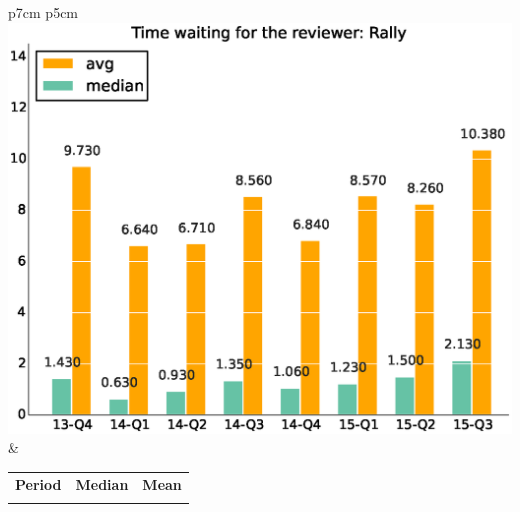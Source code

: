 \documentclass[a4wide,11pt]{article}
\begin{document}
\begin{tabular}{p{7cm} p{5cm}}
    \vspace{0pt} 
    \includegraphics[scale=.35]{figs/waiting4reviewer_avgRally.eps}
    & 
    \vspace{0pt}
    \begin{tabular}{l|r|r|}%
    \bfseries Period & \bfseries Median & \bfseries Mean %
    \csvreader[head to column names]{data/timewaiting4reviewer_medianRally.csv}{}%
    {\\ & \mediantime & \meantime}
    \end{tabular}
\end{tabular}
\end{document}
